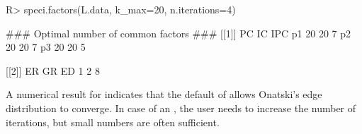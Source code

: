 \begin{CodeChunk}
\begin{CodeInput}
R> speci.factors(L.data, k_max=20, n.iterations=4)
\end{CodeInput}
\begin{CodeOutput}
### Optimal number of common factors ###
[[1]]
   PC IC IPC
p1 20 20   7
p2 20 20   7
p3 20 20   5

[[2]]
ER GR ED 
1  2  8 
\end{CodeOutput}
\end{CodeChunk}
A numerical result for  indicates that the default of  allows Onatski's \citeyearpar{Onatski2010} edge distribution to converge. In case of an , the user needs to increase the number of iterations, but small numbers are often sufficient. 

